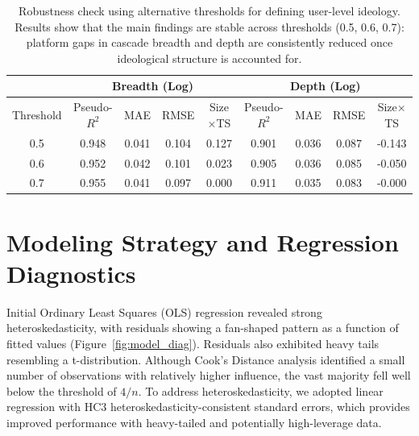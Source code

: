 \documentclass[letterpaper]{article} %
\begin{document}
\begin{table}[htbp]
\centering
\caption{Robustness check using alternative thresholds for defining user-level ideology.
Results show that the main findings are stable across thresholds (0.5, 0.6, 0.7):
platform gaps in cascade breadth and depth are consistently reduced once ideological structure is accounted for.}
\label{tab:robust_threshold}
\begin{tabular}{ccccc|cccc}
\hline
 & \multicolumn{4}{c}{Breadth (Log)} & \multicolumn{4}{c}{Depth (Log)} \\
\hline
 Threshold& Pseudo-$R^2$ & MAE & RMSE & Size$\times$TS  & Pseudo-$R^2$ & MAE & RMSE & Size$\times$TS  \\
\hline
0.5 & 0.948 & 0.041 & 0.104 & 0.127 &  0.901 & 0.036 & 0.087 & -0.143  \\
0.6 & 0.952 & 0.042 & 0.101 & 0.023 & 0.905 & 0.036 & 0.085 & -0.050  \\
0.7 & 0.955 & 0.041 & 0.097 & 0.000 &  0.911 & 0.035 & 0.083 & -0.000  \\
\hline
\end{tabular}
\end{table}



\section{Modeling Strategy and Regression Diagnostics}
\label{app:strategy}
Initial Ordinary Least Squares (OLS) regression revealed strong heteroskedasticity, with residuals showing a fan-shaped pattern as a function of fitted values (Figure~\ref{fig:model_diag}). Residuals also exhibited heavy tails resembling a t-distribution. Although Cook's Distance analysis identified a small number of observations with relatively higher influence, the vast majority fell well below the threshold of $4/n$. To address heteroskedasticity, we adopted linear regression with HC3 heteroskedasticity-consistent standard errors, which provides improved performance with heavy-tailed and potentially high-leverage data.
\end{document}
